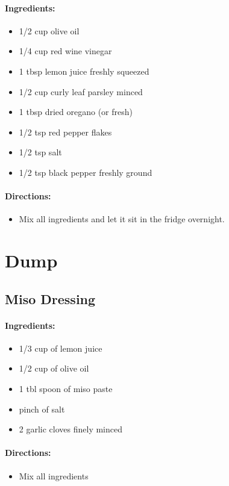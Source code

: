 \documentclass{article}
\begin{document}
\paragraph{Ingredients:}
\begin{itemize}
  \item 1/2 cup olive oil
  \item 1/4 cup red wine vinegar
  \item 1 tbsp lemon juice freshly squeezed
  \item 1/2 cup curly leaf parsley minced
  \item 1 tbsp dried oregano (or fresh)
  \item 1/2 tsp red pepper flakes
  \item 1/2 tsp salt
  \item 1/2 tsp black pepper freshly ground	
\end{itemize}

\paragraph{Directions:}
\begin{itemize}
  \item Mix all ingredients and let it sit in the fridge overnight.	
\end{itemize}

\section{Dump}

\subsection{Miso Dressing}

\paragraph{Ingredients:}

\begin{itemize}
	\item 1/3 cup of lemon juice
	\item 1/2 cup of olive oil
	\item 1 tbl spoon of miso paste
	\item pinch of salt
	\item 2 garlic cloves finely minced
\end{itemize}

\paragraph{Directions:}
\begin{itemize}
	\item Mix all ingredients
\end{itemize}
\end{document}
